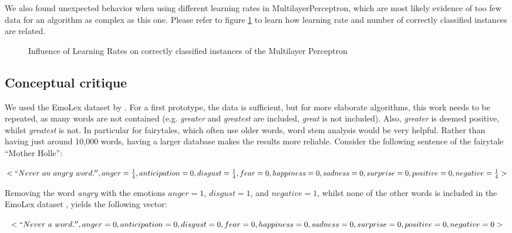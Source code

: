 \documentclass[letterpaper]{article}
\begin{document}
We also found unexpected behavior when using different learning rates in MultilayerPerceptron, which are most likely evidence of too few data for an algorithm as complex as this one. Please refer to figure \ref{figure:learningRate} to learn how learning rate and number of correctly classified instances are related. 

\begin{figure}[thpb]
      \centering
      \caption{Influence of Learning Rates on correctly classified instances of the Multilayer Perceptron}
      \label{figure:learningRate}
\end{figure}

\subsection{Conceptual critique}
We used the EmoLex dataset by \citeauthor{Mohammad}. For a first prototype, the data is sufficient, but for more elaborate algorithms, this work needs to be repeated, as many words are not contained (e.g. \textit{greater} and \textit{greatest} are included, \textit{great} is not included). Also, \textit{greater} is deemed positive, whilst \textit{greatest} is not. In particular for fairytales, which often use older words, word stem analysis would be very helpful. Rather than having just around 10,000 words, having a larger database makes the results more reliable. Consider the following sentence of the fairytale ``Mother Holle'':

$<``Never\ an\ angry\ word.'',anger=\frac{1}{4}, anticipation=0, disgust=\frac{1}{4}, fear=0, happiness=0, sadness=0, surprise=0, positive=0, negative=\frac{1}{4}>$

Removing the word \textit{angry} with the emotions $anger=1$, $disgust=1$, and $negative=1$, whilst none of the other words is included in the EmoLex dataset \cite{Mohammad}, yields the following vector: 

$<``Never\ a\ word.'',anger=0, anticipation=0, disgust=0, fear=0, happiness=0, sadness=0, surprise=0, positive=0, negative=0>$ 
\end{document}
